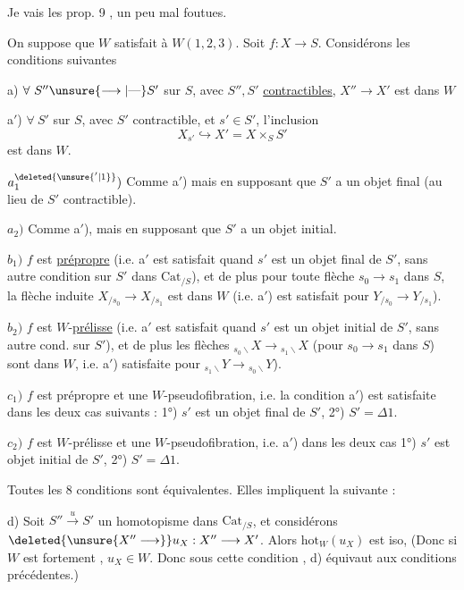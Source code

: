 Je vais  les prop. 9 , un peu mal foutues.

  On suppose que $W$ satisfait à $W(1,2,3)$. Soit $f:X\longrightarrow S$. Considérons les conditions suivantes

a)  $\forall\ S''\unsure{\longrightarrow|\text{---}}S'$ sur $S$, avec $S'',S'$ \uline{contractibles}, $X''\longrightarrow X'$ est dans $W$

a$'$) $\forall\ S'$ sur $S$, avec $S'$ contractible, et $s'\in S'$, l'inclusion
\[
X_{s'}\hookrightarrow X'=X\times_S S'
\]
est dans $W$.

$a^{\deleted{\unsure{'|1}}}_1)$ Comme a$'$) mais en supposant que $S'$ a un objet final (au lieu de $S'$ contractible).

$a_2)$ Comme a$'$), mais en supposant que $S'$ a un objet initial.

$b_1)$ $f$ est \uline{prépropre} (i.e. a$'$  est satisfait quand $s'$ est un objet final de $S'$, sans autre condition sur $S'$ dans $\mathrm{Cat}_{/S}$), et de plus pour toute flèche $s_0\longrightarrow s_1$ dans $S$, la flèche induite $X_{/s_0}\longrightarrow X_{/s_1}$ est dans $W$ (i.e. a$'$) est satisfait pour $Y_{/s_0}\longrightarrow Y_{/s_1}$).

$b_2)$ $f$ est $W$-\uline{prélisse} (i.e. a$'$ est satisfait quand $s'$ est un objet initial de $S'$, sans autre cond. sur $S'$), et de plus les flèches $ {}_{s_0\backslash}X\longrightarrow{}_{s_1\backslash}X$ (pour $s_0\to s_1$ dans $S$) sont dans $W$, i.e. a$'$) satisfaite pour $ {}_{s_1\backslash}Y\longrightarrow{}_{s_0\backslash}Y$).

$c_1)$ $f$ est prépropre\deleted{\unsure{,}} et  une $W$-pseudofibration, i.e. la condition a$'$) est satisfaite dans les deux cas suivants : 1°) $s'$ est un objet final de $S'$, 2°) $S'=\Delta1$.

$c_2)$ $f$ est $W$-prélisse et une $W$-pseudofibration, i.e. a$'$) dans les deux cas 1°) $s'$ est objet initial de $S'$, 2°) $S'=\Delta1$.

Toutes les 8 conditions sont équivalentes. Elles impliquent la suivante :

d) Soit $S''\overset{u}{\longrightarrow} S'$ un homotopisme dans $\mathrm{Cat}_{/S}$,  et considérons $\deleted{\unsure{X''\longrightarrow}}u_X:X''\longrightarrow X'$. Alors $\mathrm{hot}_W(u_X)$  est iso,
(Donc si $W$ est fortement , $u_X\in W$.  Donc sous cette condition , d) équivaut aux conditions précédentes.)
